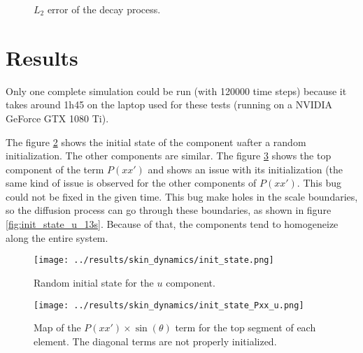 \documentclass[a4paper]{article}
\begin{document}
\begin{figure}
\label{fig:err2-decay}
\caption{$L_2$ error of the decay process.}
\end{figure}

\section{Results}
\label{sec:results}

Only one complete simulation could be run (with 120000 time steps) because it takes around 1h45 on the laptop used for these tests (running on a NVIDIA GeForce GTX 1080 Ti).

The figure \ref{fig:init_state_u} shows the initial state of the component $u$after a random initialization. The other components are similar. The figure \ref{fig:init_state_Pxx_u} shows the top component of the term $P(xx')$ and shows an issue with its initialization (the same kind of issue is observed for the other components of $P(xx')$. This bug could not be fixed in the given time. This bug make holes in the scale boundaries, so the diffusion process can go through these boundaries, as shown in figure \ref{fig:init_state_u_13s}. Because of that, the components tend to homogeneize along the entire system.

\begin{figure}
\label{fig:init_state_u}
	\texttt{[image: ../results/skin\_dynamics/init\_state.png]}
	\caption{Random initial state for the $u$ component.}
\end{figure}

\begin{figure}
\label{fig:init_state_Pxx_u}
	\texttt{[image: ../results/skin\_dynamics/init\_state\_Pxx\_u.png]}
	\caption{Map of the $P(xx') \times \sin(\theta)$ term for the top segment of each element. The diagonal terms are not properly initialized.}
\end{figure}
\end{document}
